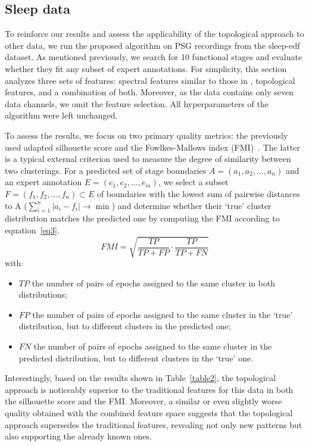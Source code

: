\documentclass[journal,twoside,web]{ieeecolor2}
\begin{document}
\subsection{Sleep data}

To reinforce our results and assess the applicability of the topological approach to other data, we run the proposed algorithm on PSG recordings from the sleep-edf~\cite{SleepEdf,PhysioNet} dataset. As mentioned previously, we search for 10 functional stages and evaluate whether they fit any subset of expert annotations. For simplicity, this section analyzes three sets of features: spectral features similar to those in \cite{SDA}, topological features, and a combination of both. Moreover, as the data contains only seven data channels, we omit the feature selection. All hyperparameters of the algorithm were left unchanged.

To assess the results, we focus on two primary quality metrics: the previously used adapted silhouette score and the Fowlkes-Mallows index (FMI)~\cite{Fowlkes01091983}. The latter is a typical external criterion used to measure the degree of similarity between two clusterings. For a predicted set of stage boundaries $A = (a_1, a_2, \dots, a_n)$ and an expert annotation $E = (e_1, e_2, \dots, e_m)$, we select a subset $F = (f_1, f_2, \dots, f_n) \subset E$ of boundaries with the lowest sum of pairwise distances to A ($\sum_{i = 1}^{n} |a_i - f_i| \rightarrow \min$) and determine whether their `true' cluster distribution matches the predicted one by computing the FMI according to equation~\eqref{eq3}.
\begin{equation}
    FMI = \sqrt{\frac{TP}{TP + FP} \cdot \frac{TP}{TP + FN}} \label{eq3}
\end{equation}
with:
\begin{itemize}
    \item
        $TP$ the number of pairs of epochs assigned to the same cluster in both distributions;
    \item
        $FP$ the number of pairs of epochs assigned to the same cluster in the `true' distribution, but to different clusters in the predicted one;
    \item
        $FN$ the number of pairs of epochs assigned to the same cluster in the predicted distribution, but to different clusters in the `true' one.
\end{itemize}

Interestingly, based on the results shown in Table~\ref{table2}, the topological approach is noticeably superior to the traditional features for this data in both the silhouette score and the FMI. Moreover, a similar or even slightly worse quality obtained with the combined feature space suggests that the topological approach supersedes the traditional features, revealing not only new patterns but also supporting the already known ones.
\end{document}
